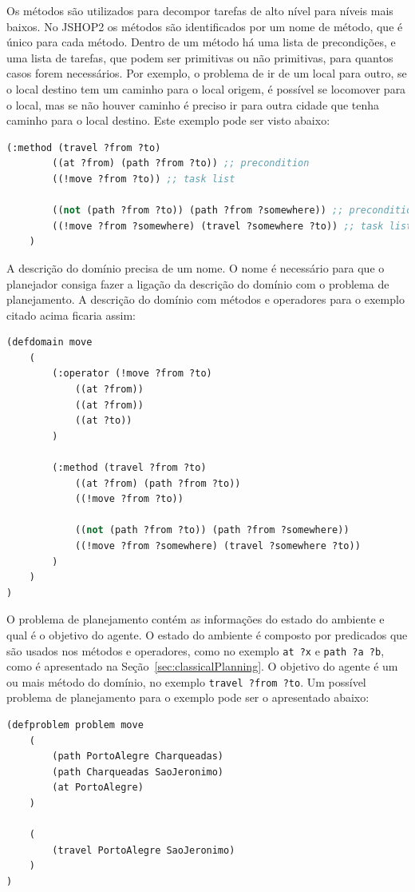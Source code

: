 Os métodos são utilizados para decompor tarefas de alto nível para níveis mais baixos. 
No JSHOP2 os métodos são identificados por um nome de método, que é único para cada método. 
Dentro de um método há uma lista de precondições, e uma lista de tarefas, que podem ser primitivas ou não primitivas, para quantos casos forem necessários. 
Por exemplo, o problema de ir de um local para outro, se o local destino tem um caminho para o local origem, é possível se locomover para o local, mas se não houver caminho é preciso ir para outra cidade que tenha caminho para o local destino. 
Este exemplo pode ser visto abaixo:

\lstset{style=codeStyle}
\begin{lstlisting}[language=lisp]
	(:method (travel ?from ?to)
		((at ?from) (path ?from ?to)) ;; precondition 
		((!move ?from ?to)) ;; task list
		
		((not (path ?from ?to)) (path ?from ?somewhere)) ;; precondition 
		((!move ?from ?somewhere) (travel ?somewhere ?to)) ;; task list
	)
\end{lstlisting}

A descrição do domínio precisa de um nome. 
O nome é necessário para que o planejador consiga fazer a ligação da descrição do domínio com o problema de planejamento. 
A descrição do domínio com métodos e operadores para o exemplo citado acima ficaria assim:

\lstset{style=codeStyle}
\begin{lstlisting}[language=lisp]
(defdomain move
	(	
		(:operator (!move ?from ?to) 
			((at ?from)) 
			((at ?from))
			((at ?to))
		)
		
		(:method (travel ?from ?to)
			((at ?from) (path ?from ?to))
			((!move ?from ?to))
		
			((not (path ?from ?to)) (path ?from ?somewhere))
			((!move ?from ?somewhere) (travel ?somewhere ?to))
		)    
	)
)
\end{lstlisting}

O problema de planejamento contém as informações do estado do ambiente e qual é o objetivo do agente. 
O estado do ambiente é composto por predicados que são usados nos métodos e operadores, como no exemplo \texttt{at ?x} e \texttt{path ?a ?b}, como é apresentado na Seção~\ref{sec:classicalPlanning}.
O objetivo do agente é um ou mais método do domínio, no exemplo \texttt{travel ?from ?to}. Um possível problema de planejamento para o exemplo pode ser o apresentado abaixo:


\begin{lstlisting}[language=lisp]
(defproblem problem move
	( 
		(path PortoAlegre Charqueadas)
		(path Charqueadas SaoJeronimo)
		(at PortoAlegre)
	)
	
	(
		(travel PortoAlegre SaoJeronimo)
	)
)
\end{lstlisting}

